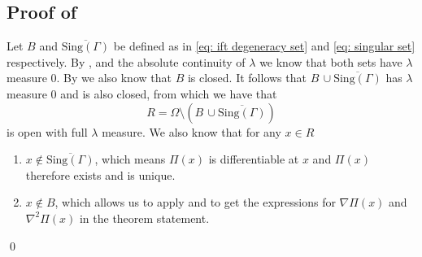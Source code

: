\documentclass[11pt]{article}
\begin{document}
\subsection{Proof of } \label{sec: proof of differentiability of pi}
Let $B$ and $\overline{\text{Sing}(\Gamma)}$ be defined as in \cref{eq: ift degeneracy set} and \cref{eq: singular set} respectively. By ,  and the absolute continuity of $\lambda$ we know that both sets have $\lambda$ measure $0$. By  we also know that $B$ is closed. It follows that $B \, \cup \overline{\text{Sing}(\Gamma)}$ has $\lambda$ measure $0$ and is also closed, from which we have that 
\begin{equation}
    R = \Omega \setminus \left( B \, \cup \overline{\text{Sing}(\Gamma)}\right) \label{eq: good set}
\end{equation}
is open with full $\lambda$ measure. We also know that for any $x \in R$
\begin{enumerate}
    \item $x \notin \overline{\text{Sing}(\Gamma)}$, which means $\Pi(x)$ is differentiable at $x$ and $\Pi(x)$ therefore exists and is unique. 
    \item $x \notin B$, which allows us to apply  and  to get the expressions for $\nabla\Pi(x)$ and $\nabla^2\Pi(x)$ in the theorem statement.
\end{enumerate}
\qed{}
\end{document}
